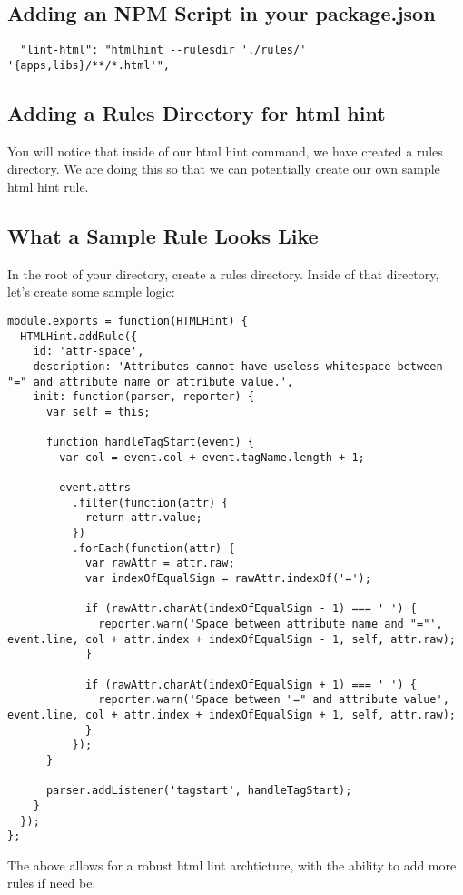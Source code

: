 \subsection{Adding an NPM Script in your package.json}
\begin{lstlisting}
  "lint-html": "htmlhint --rulesdir './rules/' '{apps,libs}/**/*.html'",
\end{lstlisting}

\subsection{Adding a Rules Directory for html hint}
You will notice that inside of our html hint command, we have created a rules
directory. We are doing this so that we can potentially create our own sample
html hint rule.

\subsection{What a Sample Rule Looks Like}
In the root of your directory, create a rules directory. Inside of that
directory, let's create some sample logic:
\begin{lstlisting}
module.exports = function(HTMLHint) {
  HTMLHint.addRule({
    id: 'attr-space',
    description: 'Attributes cannot have useless whitespace between "=" and attribute name or attribute value.',
    init: function(parser, reporter) {
      var self = this;

      function handleTagStart(event) {
        var col = event.col + event.tagName.length + 1;

        event.attrs
          .filter(function(attr) {
            return attr.value;
          })
          .forEach(function(attr) {
            var rawAttr = attr.raw;
            var indexOfEqualSign = rawAttr.indexOf('=');

            if (rawAttr.charAt(indexOfEqualSign - 1) === ' ') {
              reporter.warn('Space between attribute name and "="', event.line, col + attr.index + indexOfEqualSign - 1, self, attr.raw);
            }

            if (rawAttr.charAt(indexOfEqualSign + 1) === ' ') {
              reporter.warn('Space between "=" and attribute value', event.line, col + attr.index + indexOfEqualSign + 1, self, attr.raw);
            }
          });
      }

      parser.addListener('tagstart', handleTagStart);
    }
  });
};
\end{lstlisting}

The above allows for a robust html lint archticture, with the ability to add
more rules if need be.
